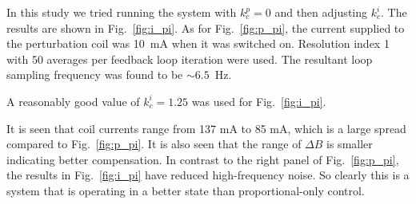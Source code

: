 

In this study we tried running the system with $k_c^p=0$ and then
adjusting $k_c^i$.  The results are shown in Fig.~\ref{fig:i_pi}.  As
for Fig.~\ref{fig:p_pi}, the current supplied to the perturbation coil
was 10~mA when it was switched on.  Resolution index 1 with 50
averages per feedback loop iteration were used.  The resultant loop
sampling frequency was found to be $\sim 6.5$~Hz.

A reasonably good value of $k_c^i=1.25$ was used for
Fig.~\ref{fig:i_pi}.

It is seen that coil currents range from 137 mA to 85 mA, which is a
large spread compared to Fig.~\ref{fig:p_pi}. It is also seen that the
range of $\Delta B$ is smaller indicating better compensation.  In
contrast to the right panel of Fig.~\ref{fig:p_pi}, the results in
Fig.~\ref{fig:i_pi} have reduced high-frequency noise.  So clearly
this is a system that is operating in a better state than
proportional-only control.

